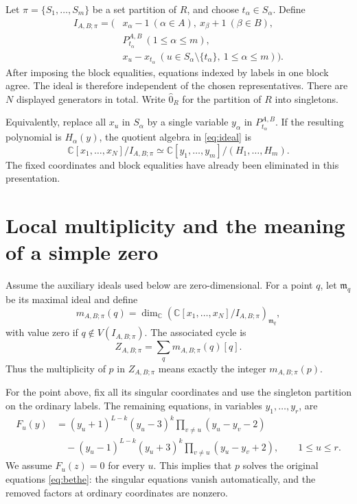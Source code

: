 \documentclass[11pt]{article}
\newcommand{\C}{\mathbb C}
\begin{document}
Let $\pi=\{S_1,\ldots,S_m\}$ be a set partition of $R$, and choose
$t_\alpha\in S_\alpha$. Define
\begin{equation}\label{eq:ideal}
\begin{aligned}
 I_{A,B;\pi}=\bigl(&x_\alpha-1\ (\alpha\in A),\
                    x_\beta+1\ (\beta\in B),\\
                 &P_{t_\alpha}^{A,B}\ (1\leq\alpha\leq m),\\
                 &x_u-x_{t_\alpha}\
                   (u\in S_\alpha\setminus\{t_\alpha\},
                    \ 1\leq\alpha\leq m)\bigr).
\end{aligned}
\end{equation}
After imposing the block equalities, equations indexed by labels in
one block agree. The ideal is therefore independent of the chosen
representatives. There are $N$ displayed generators in total.
Write $\hat0_R$ for the partition of $R$ into singletons.

Equivalently, replace all $x_u$ in $S_\alpha$ by a single variable
$y_\alpha$ in $P_{t_\alpha}^{A,B}$. If the resulting polynomial is
$H_\alpha(y)$, the quotient algebra in \eqref{eq:ideal} is
\[
 \C[x_1,\ldots,x_N]/I_{A,B;\pi}
 \simeq \C[y_1,\ldots,y_m]/(H_1,\ldots,H_m).
\]
The fixed coordinates and block equalities have already been eliminated
in this presentation.

\section{Local multiplicity and the meaning of a simple zero}

Assume the auxiliary ideals used below are zero-dimensional.
For a point $q$, let $\mathfrak m_q$ be its maximal ideal and define
\begin{equation}\label{eq:local-length}
 m_{A,B;\pi}(q)=
 \dim_\C\left(\C[x_1,\ldots,x_N]/I_{A,B;\pi}\right)_{\mathfrak m_q},
\end{equation}
with value zero if $q\notin V(I_{A,B;\pi})$.
The associated cycle is
\[
 Z_{A,B;\pi}=\sum_q m_{A,B;\pi}(q)[q].
\]
Thus the multiplicity of $p$ in $Z_{A,B;\pi}$ means exactly the
integer $m_{A,B;\pi}(p)$.

For the point above, fix all its singular coordinates and use the
singleton partition on the ordinary labels. The remaining equations,
in variables $y_1,\ldots,y_r$, are
\begin{equation}\label{eq:fully-reduced}
\begin{aligned}
 F_u(y)&=(y_u+1)^{L-k}(y_u-3)^k
                  \prod_{v\ne u}(y_u-y_v-2)\\
       &\quad -(y_u-1)^{L-k}(y_u+3)^k
                  \prod_{v\ne u}(y_u-y_v+2),
 \qquad 1\leq u\leq r.
\end{aligned}
\end{equation}
We assume $F_u(z)=0$ for every $u$. This implies that $p$ solves
the original equations \eqref{eq:bethe}: the singular equations vanish
automatically, and the removed factors at ordinary coordinates are
nonzero.
\end{document}
